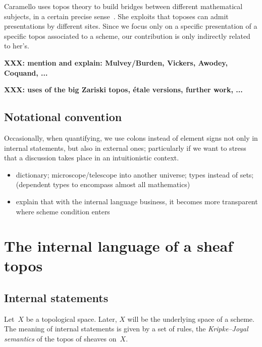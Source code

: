 \documentclass[10pt]{amsart}
\theoremstyle{definition}
\theoremstyle{plain}
\theoremstyle{remark}
\newcommand{\Sh}{\mathrm{Sh}}
\newcommand{\?}{\,{:}\,}
\renewcommand{\_}{\mathpunct{.}\,}
\newcommand{\notat}[1]{{!#1}}
\newcommand{\XXX}[1]{\textbf{XXX: #1}}
\newcommand{\defequiv}{\vcentcolon\equiv}
\begin{document}
Caramello uses topos theory to build bridges between different mathematical
subjects, in a certain precise sense~\cite{caramello:1,caramello:2}. She
exploits that toposes can admit presentations by different sites. Since we
focus only on a specific presentation of a specific topos associated to a
scheme, our contribution is only indirectly related to her's.

\XXX{mention and explain: Mulvey/Burden, Vickers, Awodey, Coquand, ...}

\XXX{uses of the big Zariski topos, étale versions, further work, ...}


\subsection*{Notational convention} Occasionally, when quantifying, we use
colons instead of element signs not only in internal statements, but also in
external ones; particularly if we want to stress that a discussion takes place
in an intuitionistic context.



\begin{itemize}
\item dictionary; microscope/telescope into another
universe; types instead of sets; (dependent types to encompass almost all
mathematics)
\item explain that with the internal language business, it becomes more
transparent where scheme condition enters
\end{itemize}


\section{The internal language of a sheaf topos}

\subsection{Internal statements}
Let~$X$ be a topological space. Later, $X$ will be the underlying space of a
scheme. The meaning of internal statements is given by a set of rules, the
\emph{Kripke--Joyal semantics} of the topos of sheaves on~$X$.
\end{document}
